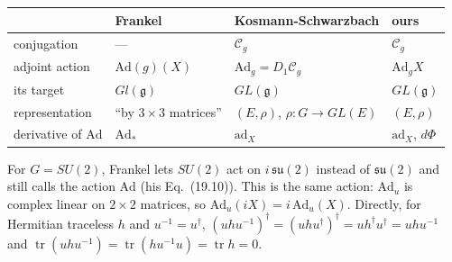 \begin{center}
\small
\begin{tabular}{llll}
 & Frankel & Kosmann-Schwarzbach & ours\\\hline
 conjugation & --- & $\mathcal C_g$ & $\mathcal C_g$\\
 adjoint action & $\mathrm{Ad}(g)(X)$ & $\mathrm{Ad}_g=D_1\mathcal C_g$ &
   $\mathrm{Ad}_gX$\\
 its target & $Gl(\mathfrak g)$ & $GL(\mathfrak g)$ & $GL(\mathfrak g)$\\
 representation & ``by $3\times3$ matrices'' & $(E,\rho)$,
   $\rho\colon G\to GL(E)$ & $(E,\rho)$\\
 derivative of $\mathrm{Ad}$ & $\mathrm{Ad}_*$ & $\mathrm{ad}_X$ &
   $\mathrm{ad}_X$, $d\Phi$
\end{tabular}
\end{center}

For $G=SU(2)$, Frankel lets $SU(2)$ act on $i\,\mathfrak{su}(2)$ instead of
$\mathfrak{su}(2)$ and still calls the action $\mathrm{Ad}$ (his
Eq.~(19.10)). This is the same action: $\mathrm{Ad}_u$ is complex linear on
$2\times2$ matrices, so $\mathrm{Ad}_u(iX)=i\,\mathrm{Ad}_u(X)$. Directly,
for Hermitian traceless $h$ and $u^{-1}=u^\dagger$,
$(uhu^{-1})^\dagger=(uhu^\dagger)^\dagger=uh^\dagger u^\dagger=uhu^{-1}$ and
$\operatorname{tr}(uhu^{-1})=\operatorname{tr}(hu^{-1}u)=\operatorname{tr}h=0$.


